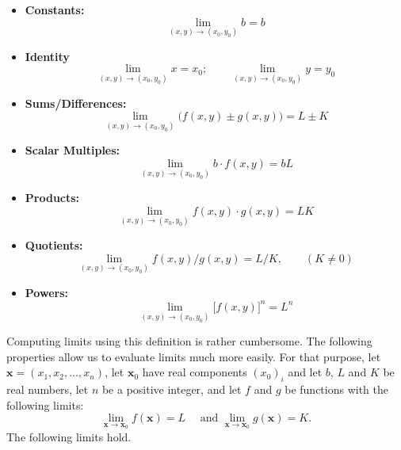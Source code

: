 \begin{itemize}
\item \textbf{Constants:} $$\displaystyle \lim_{(x,y)\to (x_0,y_0)} b = b$$
\item	\textbf{Identity }	$$\displaystyle \lim_{(x,y)\to (x_0,y_0)} x = x_0;\qquad \displaystyle \lim_{(x,y)\to (x_0,y_0)} y = y_0$$
\item	\textbf{Sums/Differences:} $$\displaystyle \lim_{(x,y)\to (x_0,y_0)}\big(f(x,y)\pm g(x,y)\big) = L\pm K$$
\item	\textbf{Scalar Multiples:}	$$\displaystyle \lim_{(x,y)\to (x_0,y_0)} b\cdot f(x,y) = bL$$
\item	\textbf{Products:}	$$\displaystyle \lim_{(x,y)\to (x_0,y_0)} f(x,y)\cdot g(x,y) = LK$$
\item	\textbf{Quotients:} $$\displaystyle \lim_{(x,y)\to (x_0,y_0)} f(x,y)/g(x,y) = L/K,\qquad (K\neq 0)$$
\item	\textbf{Powers:} 	$$\displaystyle \lim_{(x,y)\to (x_0,y_0)} \big[f(x,y)\big]^n = L^n$$

\end{itemize}
\fi



\ifanalysis
Computing limits using this definition is rather cumbersome. The following properties allow us to evaluate limits much more easily. For that purpose, let $\mathbf{x}=(x_1,x_2,\ldots,x_n)$, let $\mathbf{x}_0$ have real components $(x_{0})_i$ and let $b$, $L$ and $K$ be real numbers,  let $n$ be a positive integer, and let $f$ and $g$ be functions with the following limits:
$$\lim_{\mathbf{x}\to \mathbf{x}_0}f(\mathbf{x}) = L \quad \text{\ and\ } \lim_{\mathbf{x}\to \mathbf{x}_0} g(\mathbf{x}) = K.$$
The following limits hold.

